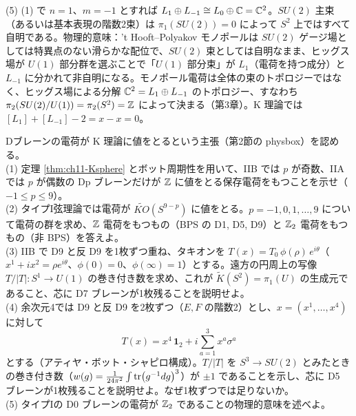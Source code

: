 \begin{solution}
(5) (1) で $n=1$、$m=-1$ とすれば $L_1\oplus L_{-1}\cong L_0\oplus\mathbb{C}=\mathbb{C}^2$。$SU(2)$ 主束（あるいは基本表現の階数2束）は $\pi_1(SU(2))=0$ によって $S^2$ 上ではすべて自明である。物理的意味：'t Hooft--Polyakov モノポールは $SU(2)$ ゲージ場としては特異点のない滑らかな配位で、$SU(2)$ 束としては自明なまま、ヒッグス場が $U(1)$ 部分群を選ぶことで「$U(1)$ 部分束」が $L_1$（電荷を持つ成分）と $L_{-1}$ に分かれて非自明になる。モノポール電荷は全体の束のトポロジーではなく、ヒッグス場による分解 $\mathbb{C}^2=L_1\oplus L_{-1}$ のトポロジー、すなわち $\pi_2(SU(2)/U(1))=\pi_2(S^2)=\mathbb{Z}$ によって決まる（第3章）。K 理論では $[L_1]+[L_{-1}]-2=x-x=0$。
\end{solution}

\begin{problem}[難易度 D]\label{ch11-prob-dbrane}
Dブレーンの電荷が K 理論に値をとるという主張（第2節の physbox）を認める。\\
(1) 定理 \ref{thm:ch11-Ksphere} とボット周期性を用いて、IIB では $p$ が奇数、IIA では $p$ が偶数の Dp ブレーンだけが $\mathbb{Z}$ に値をとる保存電荷をもつことを示せ（$-1\le p\le9$）。\\
(2) タイプI弦理論では電荷が $\widetilde{KO}(S^{9-p})$ に値をとる。$p=-1,0,1,\dots,9$ について電荷の群を求め、$\mathbb{Z}$ 電荷をもつもの（BPS の D1, D5, D9）と $\mathbb{Z}_2$ 電荷をもつもの（非 BPS）を答えよ。\\
(3) IIB で D9 と反 D9 を1枚ずつ重ね、タキオンを $T(x)=T_0\,\phi(\rho)\,e^{i\theta}$（$x^1+ix^2=\rho e^{i\theta}$、$\phi(0)=0$、$\phi(\infty)=1$）とする。遠方の円周上の写像 $T/\lvert T\rvert\colon S^1\to U(1)$ の巻き付き数を求め、これが $\tilde K(S^2)=\pi_1(U)$ の生成元であること、芯に D7 ブレーンが1枚残ることを説明せよ。\\
(4) 余次元4では D9 と反 D9 を2枚ずつ（$E,F$ の階数2）とし、$x=(x^1,\dots,x^4)$ に対して
\[
T(x)=x^4\,\mathbf 1_2+i\sum_{a=1}^3x^a\sigma^a
\]
とする（アティヤ・ボット・シャピロ構成）。$T/\lvert T\rvert$ を $S^3\to SU(2)$ とみたときの巻き付き数（$w(g)=\frac1{24\pi^2}\int\tr(g^{-1}dg)^3$）が $\pm1$ であることを示し、芯に D5 ブレーンが1枚残ることを説明せよ。なぜ1枚ずつでは足りないか。\\
(5) タイプIの D0 ブレーンの電荷が $\mathbb{Z}_2$ であることの物理的意味を述べよ。
\end{problem}

